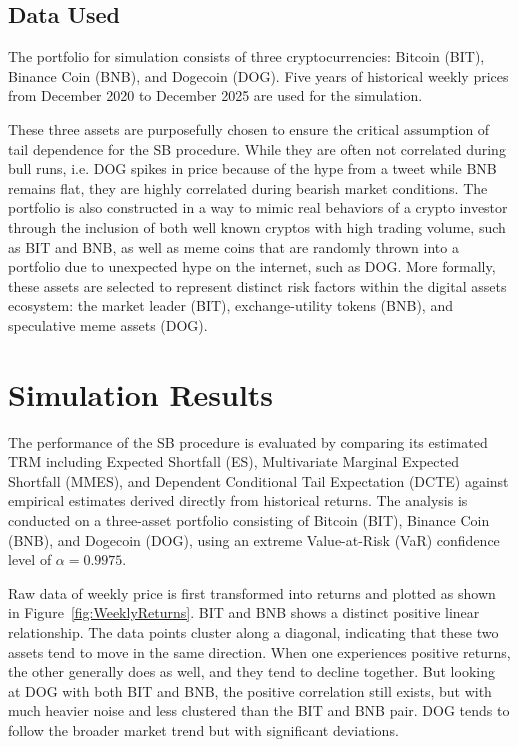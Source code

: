 \documentclass[a4paper,11pt]{article}
\begin{document}
\subsection{Data Used}

The portfolio for simulation consists of three cryptocurrencies: Bitcoin (BIT), Binance Coin (BNB), and Dogecoin (DOG).
Five years of historical weekly prices from December 2020 to December 2025 are used for the simulation.

These three assets are purposefully chosen to ensure the critical assumption of tail dependence for the SB procedure.
While they are often not correlated during bull runs, i.e. DOG spikes in price because of the hype from a tweet while BNB remains flat,
they are highly correlated during bearish market conditions.
The portfolio is also constructed in a way to mimic real behaviors of a crypto investor through the inclusion of both well known cryptos with high trading volume, such as BIT and BNB, as well as meme coins that are randomly thrown into a portfolio due to unexpected hype on the internet, such as DOG.
More formally, these assets are selected to represent distinct risk factors within the digital assets ecosystem: the market leader (BIT), exchange-utility tokens (BNB), and speculative meme assets (DOG).

\section{Simulation Results}

The performance of the SB procedure is evaluated by comparing its estimated TRM including Expected Shortfall (ES), Multivariate Marginal Expected Shortfall (MMES), and Dependent Conditional Tail Expectation (DCTE) against empirical estimates derived directly from historical returns.
The analysis is conducted on a three-asset portfolio consisting of Bitcoin (BIT), Binance Coin (BNB), and Dogecoin (DOG), using an extreme Value-at-Risk (VaR) confidence level of $\alpha = 0.9975$.

Raw data of weekly price is first transformed into returns and plotted as shown in Figure~\ref{fig:WeeklyReturns}.
BIT and BNB shows a distinct positive linear relationship.
The data points cluster along a diagonal, indicating that these two assets tend to move in the same direction.
When one experiences positive returns, the other generally does as well, and they tend to decline together.
But looking at DOG with both BIT and BNB, the positive correlation still exists, but with much heavier noise and less clustered than the BIT and BNB pair.
DOG tends to follow the broader market trend but with significant deviations.
\end{document}
